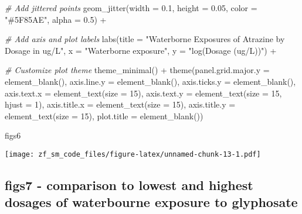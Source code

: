 \documentclass[
]{article}
\newenvironment{Shaded}{\begin{snugshade}}{\end{snugshade}}
\newcommand{\AttributeTok}[1]{\textcolor[rgb]{0.77,0.63,0.00}{#1}}
\newcommand{\CommentTok}[1]{\textcolor[rgb]{0.56,0.35,0.01}{\textit{#1}}}
\newcommand{\DecValTok}[1]{\textcolor[rgb]{0.00,0.00,0.81}{#1}}
\newcommand{\FloatTok}[1]{\textcolor[rgb]{0.00,0.00,0.81}{#1}}
\newcommand{\FunctionTok}[1]{\textcolor[rgb]{0.00,0.00,0.00}{#1}}
\newcommand{\NormalTok}[1]{#1}
\newcommand{\SpecialCharTok}[1]{\textcolor[rgb]{0.00,0.00,0.00}{#1}}
\newcommand{\StringTok}[1]{\textcolor[rgb]{0.31,0.60,0.02}{#1}}
\begin{document}
\begin{Shaded}
\begin{Highlighting}[]
  \CommentTok{\# Add jittered points}
  \FunctionTok{geom\_jitter}\NormalTok{(}\AttributeTok{width =} \FloatTok{0.1}\NormalTok{, }\AttributeTok{height =} \FloatTok{0.05}\NormalTok{, }\AttributeTok{color =} \StringTok{"\#5F85AE"}\NormalTok{, }\AttributeTok{alpha =} \FloatTok{0.5}\NormalTok{) }\SpecialCharTok{+}

  \CommentTok{\# Add axis and plot labels}
  \FunctionTok{labs}\NormalTok{(}\AttributeTok{title =} \StringTok{"Waterborne Exposures of Atrazine by Dosage in ug/L"}\NormalTok{, }\AttributeTok{x =} \StringTok{"Waterborne exposure"}\NormalTok{, }\AttributeTok{y =} \StringTok{"log(Dosage (ug/L))"}\NormalTok{)  }\SpecialCharTok{+}

  \CommentTok{\# Customize plot theme}
  \FunctionTok{theme\_minimal}\NormalTok{() }\SpecialCharTok{+}
  \FunctionTok{theme}\NormalTok{(}\AttributeTok{panel.grid.major.y =} \FunctionTok{element\_blank}\NormalTok{(),}
    \AttributeTok{axis.line.y =} \FunctionTok{element\_blank}\NormalTok{(),}
    \AttributeTok{axis.ticks.y =} \FunctionTok{element\_blank}\NormalTok{(),}
    \AttributeTok{axis.text.x =} \FunctionTok{element\_text}\NormalTok{(}\AttributeTok{size =} \DecValTok{15}\NormalTok{),}
    \AttributeTok{axis.text.y =} \FunctionTok{element\_text}\NormalTok{(}\AttributeTok{size =} \DecValTok{15}\NormalTok{, }\AttributeTok{hjust =} \DecValTok{1}\NormalTok{),}
    \AttributeTok{axis.title.x =} \FunctionTok{element\_text}\NormalTok{(}\AttributeTok{size =} \DecValTok{15}\NormalTok{),}
    \AttributeTok{axis.title.y =} \FunctionTok{element\_text}\NormalTok{(}\AttributeTok{size =} \DecValTok{15}\NormalTok{),}
    \AttributeTok{plot.title =} \FunctionTok{element\_blank}\NormalTok{())}


\NormalTok{figs6}
\end{Highlighting}
\end{Shaded}

\texttt{[image: zf\_sm\_code\_files/figure-latex/unnamed-chunk-13-1.pdf]}

\hypertarget{figs7---comparison-to-lowest-and-highest-dosages-of-waterbourne-exposure-to-glyphosate}{%
\subsection{figs7 - comparison to lowest and highest dosages of
waterbourne exposure to
glyphosate}\label{figs7---comparison-to-lowest-and-highest-dosages-of-waterbourne-exposure-to-glyphosate}}
\end{document}
